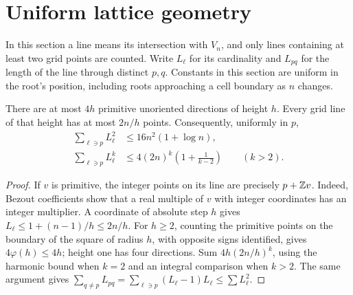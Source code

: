 \section{Uniform lattice geometry}\label{sec:geometry}

In this section a line means its intersection with \(V_n\), and only
lines containing at least two grid points are counted. Write \(L_\ell\)
for its cardinality and \(L_{pq}\) for the length of the line through
distinct \(p,q\). Constants in this section are uniform in the root's
position, including roots approaching a cell boundary as \(n\) changes.

\begin{lemma}\label{lem:lines}
There are at most \(4h\) primitive unoriented directions of height
\(h\). Every grid line of that height has at most \(2n/h\) points.
Consequently, uniformly in \(p\),
\begin{align}
 \sum_{\ell\ni p}L_\ell^2&\le16n^2(1+\log n),\label{eq:line2}\\
 \sum_{\ell\ni p}L_\ell^k&\le
 4(2n)^k\left(1+\frac1{k-2}\right)\qquad(k>2).
 \label{eq:linek}
\end{align}
\end{lemma}
\begin{proof}
If \(v\) is primitive, the integer points on its line are precisely
\(p+\mathbb Z v\). Indeed, Bezout coefficients show that a real multiple of
\(v\) with integer coordinates has an integer multiplier. A coordinate
of absolute step \(h\) gives \(L_\ell\le1+(n-1)/h\le2n/h\).
For \(h\ge2\), counting the primitive points on the boundary of the
square of radius \(h\), with opposite signs identified, gives
\(4\varphi(h)\le4h\); height one has four directions. Sum
\(4h(2n/h)^k\), using the harmonic bound when \(k=2\) and an integral
comparison when \(k>2\). The same argument gives
\(\sum_{q\ne p}L_{pq}=\sum_{\ell\ni p}(L_\ell-1)L_\ell
\le\sum L_\ell^2\).
\end{proof}

